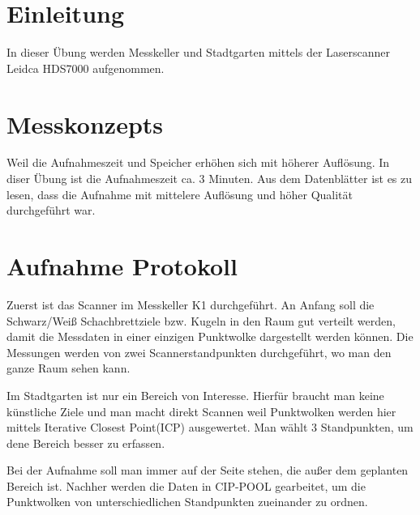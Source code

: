\documentclass[12pt]{article}
\begin{document}
	\pagestyle{main}
\tableofcontents
\newpage
\section{Einleitung}
In dieser Übung werden Messkeller und Stadtgarten mittels der Laserscanner Leidca HDS7000 aufgenommen.
\section{Messkonzepts}
Weil die Aufnahmeszeit und Speicher erhöhen sich mit höherer Auflösung. In diser Übung ist die Aufnahmeszeit ca. 3 Minuten. Aus dem Datenblätter ist es zu lesen, dass die Aufnahme mit mittelere Auflösung und höher Qualität durchgeführt war.
\section{Aufnahme Protokoll}
Zuerst ist das Scanner im Messkeller K1 durchgeführt. An Anfang soll die Schwarz/Weiß Schachbrettziele bzw. Kugeln in den Raum gut verteilt werden, damit die Messdaten in einer einzigen Punktwolke dargestellt werden können. Die Messungen werden von zwei Scannerstandpunkten durchgeführt, wo man den ganze Raum sehen kann.\newline
\begin{figure*}[ht]\centering
\end{figure*}
\newline
Im Stadtgarten ist nur ein Bereich von Interesse. Hierfür braucht man keine künstliche Ziele und man macht direkt Scannen weil Punktwolken werden hier mittels Iterative Closest Point(ICP) ausgewertet. Man wählt 3 Standpunkten, um dene Bereich besser zu erfassen.
\begin{figure*}[ht]\centering
\end{figure*}
\newline
Bei der Aufnahme soll man immer auf der Seite stehen, die außer dem geplanten Bereich ist. \newline
\newline
Nachher werden die Daten in CIP-POOL gearbeitet, um die Punktwolken von unterschiedlichen Standpunkten zueinander zu ordnen.
\end{document}
